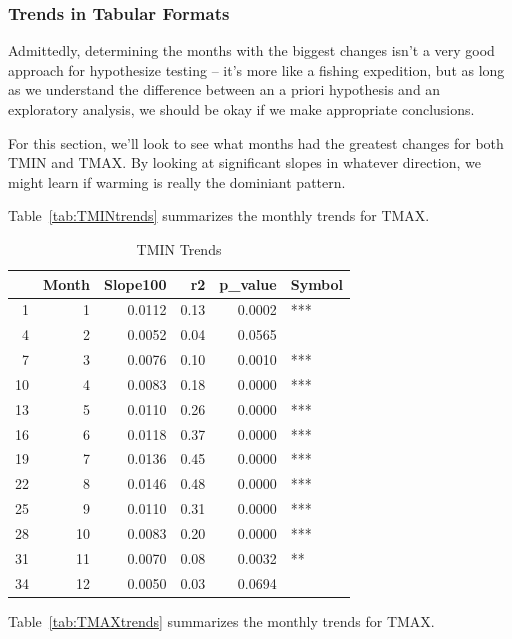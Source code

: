 \documentclass{article}\usepackage[]{graphicx}\usepackage[]{color}
\begin{document}
\subsubsection{Trends in Tabular Formats}

Admittedly, determining the months with the biggest changes isn't a very good approach for hypothesize testing -- it's more like a fishing expedition, but as long as we understand the difference between an a priori hypothesis and an exploratory analysis, we should be okay if we make appropriate conclusions. 



For this section, we'll look to see what months had the greatest changes for both TMIN and TMAX. By looking at significant slopes in whatever direction, we might learn if warming is really the dominiant pattern. 

Table~\ref{tab:TMINtrends} summarizes the monthly trends for TMAX.

\begin{table}[ht]
\centering
\begin{tabular}{rrrrrl}
  \hline
 & Month & Slope100 & r2 & p\_value & Symbol \\ 
  \hline
1 & 1 & 0.0112 & 0.13 & 0.0002 & *** \\ 
  4 & 2 & 0.0052 & 0.04 & 0.0565 &  \\ 
  7 & 3 & 0.0076 & 0.10 & 0.0010 & *** \\ 
  10 & 4 & 0.0083 & 0.18 & 0.0000 & *** \\ 
  13 & 5 & 0.0110 & 0.26 & 0.0000 & *** \\ 
  16 & 6 & 0.0118 & 0.37 & 0.0000 & *** \\ 
  19 & 7 & 0.0136 & 0.45 & 0.0000 & *** \\ 
  22 & 8 & 0.0146 & 0.48 & 0.0000 & *** \\ 
  25 & 9 & 0.0110 & 0.31 & 0.0000 & *** \\ 
  28 & 10 & 0.0083 & 0.20 & 0.0000 & *** \\ 
  31 & 11 & 0.0070 & 0.08 & 0.0032 & ** \\ 
  34 & 12 & 0.0050 & 0.03 & 0.0694 &  \\ 
   \hline
\end{tabular}
\caption{TMIN Trends} 
\end{table}


Table~\ref{tab:TMAXtrends} summarizes the monthly trends for TMAX.
\end{document}
